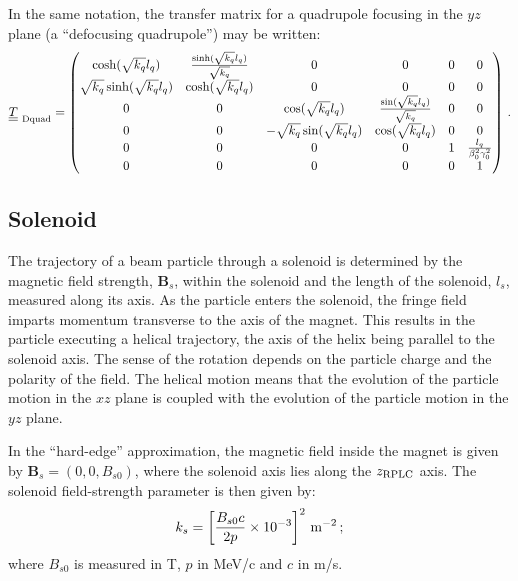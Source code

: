 In the same notation, the transfer matrix for a quadrupole focusing in
the $yz$ plane (a ``defocusing quadrupole'') may be written: 
\begin{equation}
  \underline{\underline{T}}_{\rm~Dquad} =
    \begin{pmatrix}
          \cosh(\sqrt{k_q} l_q) & \frac{\sinh(\sqrt{k_q} l_q)}{\sqrt{k_q}} & 0 & 0             & 0 & 0 \\
 \sqrt{k_q} \sinh(\sqrt{k_q} l_q) &                  \cosh(\sqrt{k_q} l_q) & 0 & 0             & 0 & 0 \\
          0 & 0 &            \cos(\sqrt{k_q} l_q) &  \frac{\sin(\sqrt{k_q} l_q)}{\sqrt{k_q}} & 0 & 0 \\
          0 & 0 &  -\sqrt{k_q} \sin(\sqrt{k_q} l_q) &                   \cos(\sqrt{k_q} l_q) & 0 & 0 \\
          0 & 0 & 0 & 0 & 1 & \frac{l_q}{\beta_0^2 \gamma_0^2} \\
          0 & 0 & 0 & 0 & 0 &                             1
        \end{pmatrix} \, .
\end{equation}

\subsection{Solenoid}

The trajectory of a beam particle through a solenoid is determined by
the magnetic field strength, $\bm{B}_s$, within the solenoid and the
length of the solenoid, $l_s$, measured along its axis.
As the particle enters the solenoid, the fringe field imparts momentum
transverse to the axis of the magnet.
This results in the particle executing a helical trajectory, the axis
of the helix being parallel to the solenoid axis.
The sense of the rotation depends on the particle charge and the
polarity of the field.
The helical motion means that the evolution of the particle motion in
the $xz$ plane is coupled with the evolution of the particle motion in
the $yz$ plane.

In the ``hard-edge'' approximation, the magnetic field inside the
magnet is given by $\bm{B}_s = (0, 0, B_{s0})$, where the solenoid axis
lies along the $z_{\rm RPLC}$ axis.
The solenoid field-strength parameter is then given by:
\begin{equation}
  k_s = \left[ \frac{B_{s0} c}{2p} \times 10^{-3} \right]^2 \, {\rm m}^{-2}\,;
  \label{Eq:Effectiveks}
\end{equation}
where $B_{s0}$ is measured in T, $p$ in MeV/c and $c$ in m/s.

